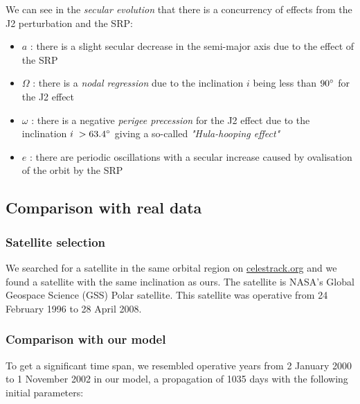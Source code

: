 \documentclass[11pt,a4paper]{report}
\begin{document}
\par We can see in the \emph{secular evolution} that there is a concurrency of effects from the J2 perturbation and the SRP:
\begin{itemize}
    \item \emph{$a$} : there is a slight secular decrease in the semi-major axis due to the effect of the SRP 
    \item \emph{$\Omega$} : there is a \emph{nodal regression} due to the inclination $i$ being less than $90\degree$ for the J2 effect
    \item  \emph{$\omega$} : there is a negative \emph{perigee precession} for the J2 effect due to the inclination $i\;> 63.4\degree$ giving a so-called \emph{"Hula-hooping effect"}
    \item \emph{$e$} : there are periodic oscillations with a secular increase caused by ovalisation of the orbit by the SRP
\end{itemize}

\subsection{Comparison with real data}

\subsubsection{Satellite selection}
We searched for a satellite in the same orbital region on \url{celestrack.org} and we found a satellite with the same inclination as ours. 
The satellite is NASA’s Global Geospace Science (GSS) Polar satellite.
This satellite was operative from 24 February 1996 to 28 April 2008.

\subsubsection{Comparison with our model}
To get a significant time span, we resembled operative years from 2 January 2000 to 1 November 2002 in our model, a propagation of 1035 days with the following initial parameters\cite{POLAR}:

\begin{table}[H]
\centering
{}
\end{table}
\end{document}
